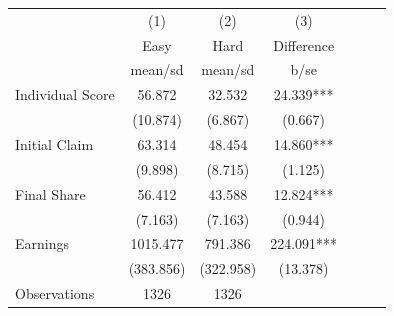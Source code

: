 {
\def\sym#1{\ifmmode^{#1}\else\(^{#1}\)\fi}
\begin{tabular}{l*{3}{cc}}
\hline\hline
                    &\multicolumn{1}{c}{(1)}&\multicolumn{1}{c}{(2)}&\multicolumn{1}{c}{(3)}\\
                    &\multicolumn{1}{c}{Easy}&\multicolumn{1}{c}{Hard}&\multicolumn{1}{c}{Difference}\\
                    &     mean/sd&     mean/sd&        b/se   \\
\hline
Individual Score    &      56.872&      32.532&      24.339***\\
                    &    (10.874)&     (6.867)&     (0.667)   \\
Initial Claim       &      63.314&      48.454&      14.860***\\
                    &     (9.898)&     (8.715)&     (1.125)   \\
Final Share         &      56.412&      43.588&      12.824***\\
                    &     (7.163)&     (7.163)&     (0.944)   \\
Earnings            &    1015.477&     791.386&     224.091***\\
                    &   (383.856)&   (322.958)&    (13.378)   \\
\hline
Observations        &        1326&        1326&               \\
\hline\hline
\end{tabular}
}
